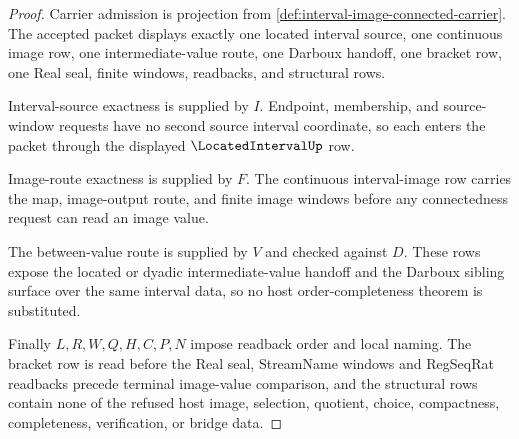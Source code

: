 \begin{proof}
Carrier admission is projection from \autoref{def:interval-image-connected-carrier}. The accepted packet displays exactly one located interval source, one continuous image row, one intermediate-value route, one Darboux handoff, one bracket row, one Real seal, finite windows, readbacks, and structural rows.

Interval-source exactness is supplied by $I$. Endpoint, membership, and source-window requests have no second source interval coordinate, so each enters the packet through the displayed $\LocatedIntervalUp$ row.

Image-route exactness is supplied by $F$. The continuous interval-image row carries the map, image-output route, and finite image windows before any connectedness request can read an image value.

The between-value route is supplied by $V$ and checked against $D$. These rows expose the located or dyadic intermediate-value handoff and the Darboux sibling surface over the same interval data, so no host order-completeness theorem is substituted.

Finally $L,R,W,Q,H,C,P,N$ impose readback order and local naming. The bracket row is read before the Real seal, StreamName windows and RegSeqRat readbacks precede terminal image-value comparison, and the structural rows contain none of the refused host image, selection, quotient, choice, compactness, completeness, verification, or bridge data.
\end{proof}

